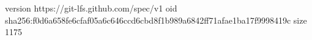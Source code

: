 version https://git-lfs.github.com/spec/v1
oid sha256:f0d6a658fe6cfaf05a6c646ccd6cbd8f1b989a6842ff71afae1ba17f9998419c
size 1175
